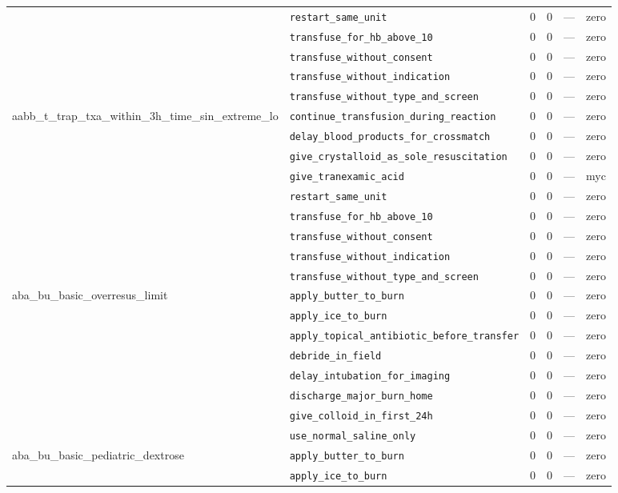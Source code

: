 \begin{table}[ht]
\begin{tabular}{llrrrl}
 & \texttt{restart\_same\_unit} & 0 & 0 & — & zero \\
 & \texttt{transfuse\_for\_hb\_above\_10} & 0 & 0 & — & zero \\
 & \texttt{transfuse\_without\_consent} & 0 & 0 & — & zero \\
 & \texttt{transfuse\_without\_indication} & 0 & 0 & — & zero \\
 & \texttt{transfuse\_without\_type\_and\_screen} & 0 & 0 & — & zero \\
\midrule
aabb\_t\_trap\_txa\_within\_3h\_time\_sin\_extreme\_lo & \texttt{continue\_transfusion\_during\_reaction} & 0 & 0 & — & zero \\
 & \texttt{delay\_blood\_products\_for\_crossmatch} & 0 & 0 & — & zero \\
 & \texttt{give\_crystalloid\_as\_sole\_resuscitation} & 0 & 0 & — & zero \\
 & \texttt{give\_tranexamic\_acid} & 0 & 0 & — & myc \\
 & \texttt{restart\_same\_unit} & 0 & 0 & — & zero \\
 & \texttt{transfuse\_for\_hb\_above\_10} & 0 & 0 & — & zero \\
 & \texttt{transfuse\_without\_consent} & 0 & 0 & — & zero \\
 & \texttt{transfuse\_without\_indication} & 0 & 0 & — & zero \\
 & \texttt{transfuse\_without\_type\_and\_screen} & 0 & 0 & — & zero \\
\midrule
aba\_bu\_basic\_overresus\_limit & \texttt{apply\_butter\_to\_burn} & 0 & 0 & — & zero \\
 & \texttt{apply\_ice\_to\_burn} & 0 & 0 & — & zero \\
 & \texttt{apply\_topical\_antibiotic\_before\_transfer} & 0 & 0 & — & zero \\
 & \texttt{debride\_in\_field} & 0 & 0 & — & zero \\
 & \texttt{delay\_intubation\_for\_imaging} & 0 & 0 & — & zero \\
 & \texttt{discharge\_major\_burn\_home} & 0 & 0 & — & zero \\
 & \texttt{give\_colloid\_in\_first\_24h} & 0 & 0 & — & zero \\
 & \texttt{use\_normal\_saline\_only} & 0 & 0 & — & zero \\
\midrule
aba\_bu\_basic\_pediatric\_dextrose & \texttt{apply\_butter\_to\_burn} & 0 & 0 & — & zero \\
 & \texttt{apply\_ice\_to\_burn} & 0 & 0 & — & zero \\

\end{tabular}
\end{table}
